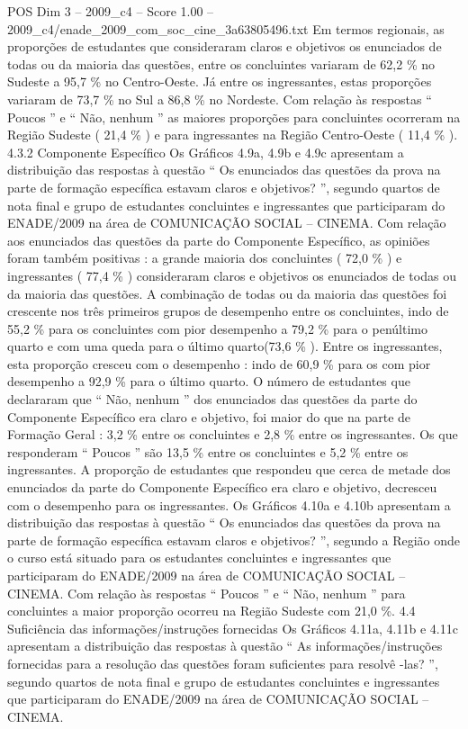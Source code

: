 \begin{textsample}{POS Dim 3 – 2009\_c4 – Score 1.00 – 2009\_c4/enade\_2009\_com\_soc\_cine\_3a63805496.txt}
Em termos regionais, as proporções de estudantes que consideraram claros e objetivos os enunciados de todas ou da maioria das questões, entre os concluintes variaram de 62,2 \% no Sudeste a 95,7 \% no Centro-Oeste.
Já entre os ingressantes, estas proporções variaram de 73,7 \% no Sul a 86,8 \% no Nordeste.
Com relação às respostas “ Poucos ” e “ Não, nenhum ” as maiores proporções para concluintes ocorreram na Região Sudeste ( 21,4 \% ) e para ingressantes na Região Centro-Oeste ( 11,4 \% ). 4.3.2 Componente Específico Os Gráficos 4.9a, 4.9b e 4.9c apresentam a distribuição das respostas à questão “ Os enunciados das questões da prova na parte de formação específica estavam claros e objetivos? ”, segundo quartos de nota final e grupo de estudantes concluintes e ingressantes que participaram do ENADE/2009 na área de COMUNICAÇÃO SOCIAL – CINEMA.
Com relação aos enunciados das questões da parte do Componente Específico, as opiniões foram também positivas : a grande maioria dos concluintes ( 72,0 \% ) e ingressantes ( 77,4 \% ) consideraram claros e objetivos os enunciados de todas ou da maioria das questões.
A combinação de todas ou da maioria das questões foi crescente nos três primeiros grupos de desempenho entre os concluintes, indo de 55,2 \% para os concluintes com pior desempenho a 79,2 \% para o penúltimo quarto e com uma queda para o último quarto(73,6 \% ).
Entre os ingressantes, esta proporção cresceu com o desempenho : indo de 60,9 \% para os com pior desempenho a 92,9 \% para o último quarto.
O número de estudantes que declararam que “ Não, nenhum ” dos enunciados das questões da parte do Componente Específico era claro e objetivo, foi maior do que na parte de Formação Geral : 3,2 \% entre os concluintes e 2,8 \% entre os ingressantes.
Os que responderam “ Poucos ” são 13,5 \% entre os concluintes e 5,2 \% entre os ingressantes.
A proporção de estudantes que respondeu que cerca de metade dos enunciados da parte do Componente Específico era claro e objetivo, decresceu com o desempenho para os ingressantes.
Os Gráficos 4.10a e 4.10b apresentam a distribuição das respostas à questão “ Os enunciados das questões da prova na parte de formação específica estavam claros e objetivos? ”, segundo a Região onde o curso está situado para os estudantes concluintes e ingressantes que participaram do ENADE/2009 na área de COMUNICAÇÃO SOCIAL – CINEMA.
Com relação às respostas “ Poucos ” e “ Não, nenhum ” para concluintes a maior proporção ocorreu na Região Sudeste com 21,0 \%. 4.4 Suficiência das informações/instruções fornecidas Os Gráficos 4.11a, 4.11b e 4.11c apresentam a distribuição das respostas à questão “ As informações/instruções fornecidas para a resolução das questões foram suficientes para resolvê -las? ”, segundo quartos de nota final e grupo de estudantes concluintes e ingressantes que participaram do ENADE/2009 na área de COMUNICAÇÃO SOCIAL – CINEMA.

\end{textsample}
